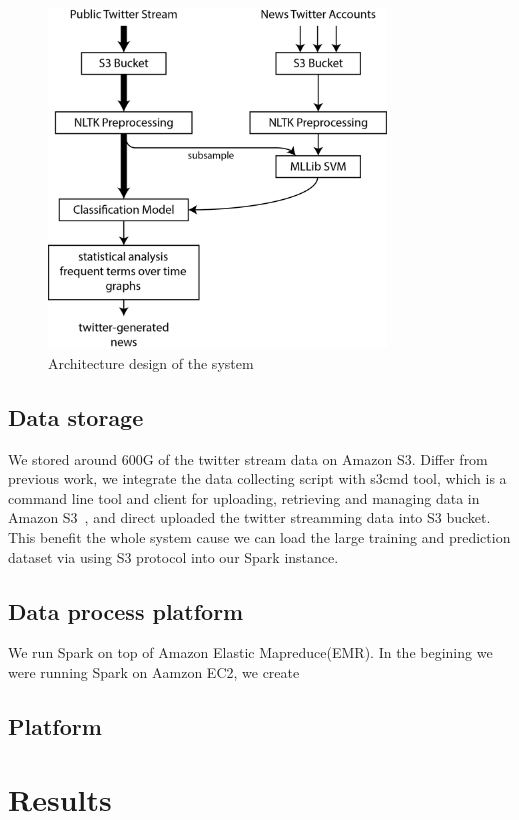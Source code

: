 \documentclass{llncs}
\begin{document}
\begin{figure}[H]
	\centering
	\includegraphics[width=0.8\textwidth]{images/system_arch.png} 
	\caption{Architecture design of the system}
	\label{fig:Architecture design of the system}
\end{figure}

\subsection{Data storage}
We stored around 600G of the twitter stream data on Amazon S3. Differ from previous work, we integrate the data collecting script with s3cmd tool, which is a command line tool and client for uploading, retrieving and managing data in Amazon S3~\cite{s3cmd}, and direct uploaded the twitter streamming data into S3 bucket. This benefit the whole system cause we can load the large training and prediction dataset via using S3 protocol into our Spark instance. 

\subsection{Data process platform}
We run Spark on top of Amazon Elastic Mapreduce(EMR). In the begining we were running Spark on Aamzon EC2, we create 


\subsection{Platform}

\section{Results}
\end{document}
